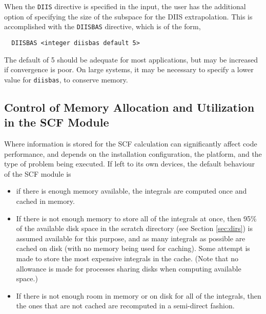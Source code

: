 When the \verb+DIIS+ directive is specified in the input, the user has
the additional option of specifying the size of the subspace for the DIIS
extrapolation.  This is accomplished with the \verb+DIISBAS+ directive,
which is of the form,

\begin{verbatim}
  DIISBAS <integer diisbas default 5>
\end{verbatim}


The default of 5 should be adequate for most applications, but may be
increased if convergence is poor.  On large systems, it may be necessary
to specify a lower value for \verb+diisbas+, to conserve memory.

\subsection{Control of Memory Allocation and Utilization in the SCF Module}
\label{sec:semidirect}

Where information is stored for the SCF calculation can significantly 
affect code performance, and depends on the installation configuration,
the platform, and the type of problem being executed.  If left to its own
devices,
the default behaviour of the SCF module is
\begin{itemize}
\item if there is enough memory available, the integrals are computed
once and cached in memory.
\item If there is not enough memory to store all of the integrals at once,
then 95\% of the available disk space in the scratch directory
  (see Section \ref{sec:dirs}) is assumed available for this purpose,
  and as many integrals as possible are cached on disk (with no
  memory being used for caching).  Some attempt is made to 
  store the most expensive integrals in the cache.  (Note that no allowance 
is made for processes sharing disks when computing available space.)
\item If there is not enough room in memory or on disk for all of the
integrals, then the ones that are not cached are
recomputed in a semi-direct fashion.
\end{itemize}

